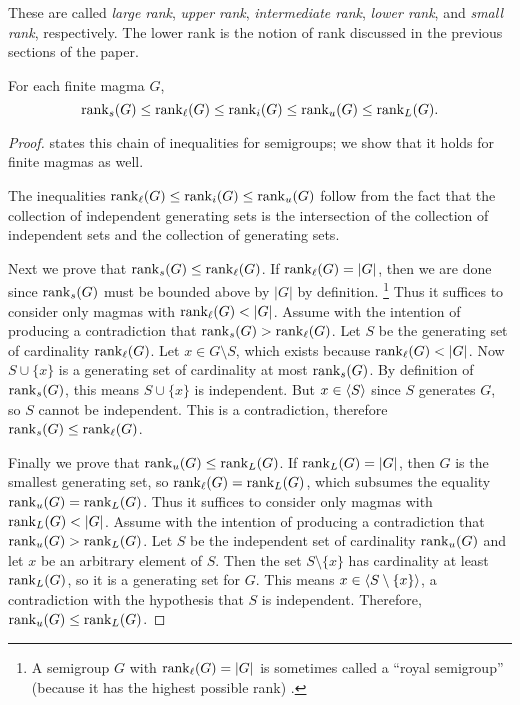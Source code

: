 These are called \emph{large rank}, \emph{upper rank}, \emph{intermediate rank}, \emph{lower rank}, and \emph{small rank}, respectively.
The lower rank is the notion of rank discussed in the previous sections of the paper.
\begin{proposition}
  For each finite magma $G$,
  \begin{equation*}
    \operatorname{rank}_s(G) \leq \operatorname{rank}_\ell(G) \leq \operatorname{rank}_i(G) \leq \operatorname{rank}_u(G) \leq \operatorname{rank}_L(G).
  \end{equation*}
\end{proposition}
\begin{proof}
  \autocite{hr00} states this chain of inequalities for semigroups; we show that it holds for finite magmas as well.

  The inequalities $\operatorname{rank}_\ell(G) \leq \operatorname{rank}_i(G) \leq \operatorname{rank}_u(G)$ follow from the fact that the collection of independent generating sets is the intersection of the collection of independent sets and the collection of generating sets.

  Next we prove that $\operatorname{rank}_s(G) \leq \operatorname{rank}_\ell(G)$.
  If $\operatorname{rank}_\ell(G) = |G|$, then we are done since $\operatorname{rank}_s(G)$ must be bounded above by $|G|$ by definition.%
  \footnote{A semigroup $G$ with $\operatorname{rank}_\ell(G) = |G|$ is sometimes called a ``royal semigroup'' (because it has the highest possible rank) \autocite{gh85}.}
  Thus it suffices to consider only magmas with $\operatorname{rank}_\ell(G) < |G|$.
  Assume with the intention of producing a contradiction that $\operatorname{rank}_s(G) > \operatorname{rank}_\ell(G)$.
  Let $S$ be the generating set of cardinality $\operatorname{rank}_\ell(G)$.
  Let $x \in G \setminus S$, which exists because $\operatorname{rank}_\ell(G) < |G|$.
  Now $S \cup \{x\}$ is a generating set of cardinality at most $\operatorname{rank}_s(G)$.
  By definition of $\operatorname{rank}_s(G)$, this means $S \cup \{x\}$ is independent.
  But $x \in \langle S \rangle$ since $S$ generates $G$, so $S$ cannot be independent.
  This is a contradiction, therefore $\operatorname{rank}_s(G) \leq \operatorname{rank}_\ell(G)$.

  Finally we prove that $\operatorname{rank}_u(G) \leq \operatorname{rank}_L(G)$.
  If $\operatorname{rank}_L(G) = |G|$, then $G$ is the smallest generating set, so $\operatorname{rank}_\ell(G) = \operatorname{rank}_L(G)$, which subsumes the equality $\operatorname{rank}_u(G) = \operatorname{rank}_L(G)$.
  Thus it suffices to consider only magmas with $\operatorname{rank}_L(G) < |G|$.
  Assume with the intention of producing a contradiction that $\operatorname{rank}_u(G) > \operatorname{rank}_L(G)$.
  Let $S$ be the independent set of cardinality $\operatorname{rank}_u(G)$ and let $x$ be an arbitrary element of $S$.
  Then the set $S \setminus \{x\}$ has cardinality at least $\operatorname{rank}_L(G)$, so it is a generating set for $G$.
  This means $x \in \langle S \setminus \{x\} \rangle$, a contradiction with the hypothesis that $S$ is independent.
  Therefore, $\operatorname{rank}_u(G) \leq \operatorname{rank}_L(G)$.
\end{proof}

